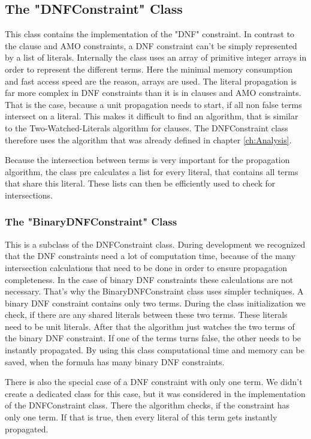 \subsection{The "DNFConstraint" Class}

This class contains the implementation of the "DNF" constraint. In contrast to the clause and AMO constraints, a DNF constraint can't be simply represented by a list of literals. Internally the class uses an array of primitive integer arrays in order to represent the different terms. Here the minimal memory consumption and fast access speed are the reason, arrays are used. The literal propagation is far more complex in DNF constraints than it is in clauses and AMO constraints. That is the case, because a unit propagation needs to start, if all non false terms intersect on a literal. This makes it difficult to find an algorithm, that is similar to the Two-Watched-Literals algorithm for clauses. The DNFConstraint class therefore uses the algorithm that was already defined in chapter \ref{ch:Analysis}.
\par
Because the intersection between terms is very important for the propagation algorithm, the class pre calculates a list for every literal, that contains all terms that share this literal. These lists can then be efficiently used to check for intersections.

\subsubsection{The "BinaryDNFConstraint" Class}

This is a subclass of the DNFConstraint class. During development we recognized that the DNF constraints need a lot of computation time, because of the many intersection calculations that need to be done in order to ensure propagation completeness. In the case of binary DNF constraints these calculations are not necessary. That's why the BinaryDNFConstraint class uses simpler techniques. A binary DNF constraint contains only two terms. During the class initialization we check, if there are any shared literals between these two terms. These literals need to be unit literals. After that the algorithm just watches the two terms of the binary DNF constraint. If one of the terms turns false, the other needs to be instantly propagated. By using this class computational time and memory can be saved, when the formula has many binary DNF constraints.

There is also the special case of a DNF constraint with only one term. We didn't create a dedicated class for this case, but it was considered in the implementation of the DNFConstraint class. There the algorithm checks, if the constraint has only one term. If that is true, then every literal of this term gets instantly propagated.

